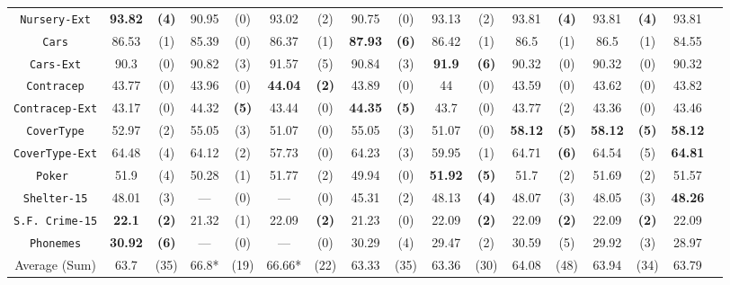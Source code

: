 \begin{sidewaystable*}[ph!]
\begin{tabular}{c|cc|cc|cc|cc|cc|cc|cc|cc}
{\tt Nursery-Ext}   &{\bf93.82}&{\bf(4)}& 90.95    & (0)    & 93.02    & (2)    & 90.75    & (0)    & 93.13    & (2)    & 93.81    &{\bf(4)}          & 93.81    & {\bf(4)} & 93.81    &          \\
{\tt Cars}          & 86.53    & (1)    & 85.39    & (0)    & 86.37    & (1)    &{\bf87.93}&{\bf(6)}& 86.42    & (1)    & 86.5     & (1)              & 86.5     & (1)      & 84.55    &          \\
{\tt Cars-Ext}      & 90.3     & (0)    & 90.82    & (3)    & 91.57    & (5)    & 90.84    & (3)    &{\bf 91.9}&{\bf(6)}& 90.32    & (0)              & 90.32    & (0)      & 90.32    &          \\
{\tt Contracep}     & 43.77    & (0)    & 43.96    & (0)    &{\bf44.04}&{\bf(2)}& 43.89    & (0)    & 44       & (0)    & 43.59    & (0)              & 43.62    & (0)      & 43.82    &          \\
{\tt Contracep-Ext} & 43.17    & (0)    & 44.32    &{\bf(5)}& 43.44    & (0)    &{\bf44.35}&{\bf(5)}& 43.7     & (0)    & 43.77    & (2)              & 43.36    & (0)      & 43.46    &          \\
{\tt CoverType}     & 52.97    & (2)    & 55.05    & (3)    & 51.07    & (0)    & 55.05    & (3)    & 51.07    & (0)    &{\bf58.12}&{\bf(5)}          &{\bf58.12}& {\bf(5)} &{\bf58.12}&          \\
{\tt CoverType-Ext} & 64.48    & (4)    & 64.12    & (2)    & 57.73    & (0)    & 64.23    & (3)    & 59.95    & (1)    & 64.71    &{\bf(6)}          & 64.54    & (5)      &{\bf64.81}&          \\
{\tt Poker }        & 51.9     & (4)    & 50.28    & (1)    & 51.77    & (2)    & 49.94    & (0)    &{\bf51.92}&{\bf(5)}& 51.7     & (2)              & 51.69    & (2)      & 51.57    &          \\
{\tt Shelter-15}    & 48.01    & (3)    & ---      & (0)    & ---      & (0)    & 45.31    & (2)    & 48.13    &{\bf(4)}& 48.07    & (3)              & 48.05    & (3)      &{\bf48.26}&          \\  
{\tt S.F. Crime-15} &{\bf22.1} &{\bf(2)}& 21.32    & (1)    & 22.09    &{\bf(2)}& 21.23    & (0)    & 22.09    &{\bf(2)}& 22.09    &{\bf(2)}          & 22.09    & {\bf(2)} & 22.09    &          \\
{\tt Phonemes}      &{\bf30.92}&{\bf(6)}& ---      & (0)    & ---      & (0)    & 30.29    & (4)    & 29.47    & (2)    & 30.59    & (5)              & 29.92    & (3)      & 28.97    &          \\
\hline
Average (Sum)       &  63.7    & (35)   & 66.8*    & (19)   & 66.66*   & (22)   & 63.33    & (35)   & 63.36    & (30)   & 64.08    & (48)             & 63.94    & (34)     & 63.79    &


\end{tabular}
\end{sidewaystable*}
